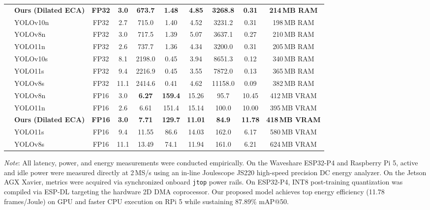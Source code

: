 \begin{table}[t]
{\begin{tabular}{llcccccccc}
\midrule
{}
 & \textbf{Ours (Dilated ECA)} & \textbf{FP32} & \textbf{3.0} & \textbf{673.7} & \textbf{1.48} & \textbf{4.85} & \textbf{3268.8} & \textbf{0.31} & \textbf{214\,MB RAM} \\
 & YOLOv10n & FP32 & 2.7 & 715.0 & 1.40 & 4.52 & 3231.2 & 0.31 & 198\,MB RAM \\
 & YOLOv8n & FP32 & 3.0 & 717.5 & 1.39 & 5.07 & 3637.1 & 0.27 & 210\,MB RAM \\
 & YOLO11n & FP32 & 2.6 & 737.7 & 1.36 & 4.34 & 3200.0 & 0.31 & 205\,MB RAM \\
 & YOLOv10s & FP32 & 8.1 & 2198.0 & 0.45 & 3.94 & 8651.3 & 0.12 & 340\,MB RAM \\
 & YOLO11s & FP32 & 9.4 & 2216.9 & 0.45 & 3.55 & 7872.0 & 0.13 & 365\,MB RAM \\
 & YOLOv8s & FP32 & 11.1 & 2414.6 & 0.41 & 4.62 & 11158.0 & 0.09 & 382\,MB RAM \\
\midrule
{}
 & YOLOv8n & FP16 & 3.0 & \textbf{6.27} & \textbf{159.4} & 15.26 & 95.7 & 10.45 & 412\,MB VRAM \\
 & YOLO11n & FP16 & 2.6 & 6.61 & 151.4 & 15.14 & 100.0 & 10.00 & 395\,MB VRAM \\
 & \textbf{Ours (Dilated ECA)} & \textbf{FP16} & \textbf{3.0} & \textbf{7.71} & \textbf{129.7} & \textbf{11.01} & \textbf{84.9} & \textbf{11.78} & \textbf{418\,MB VRAM} \\
 & YOLO11s & FP16 & 9.4 & 11.55 & 86.6 & 14.03 & 162.0 & 6.17 & 580\,MB VRAM \\
 & YOLOv8s & FP16 & 11.1 & 13.49 & 74.1 & 11.94 & 161.0 & 6.21 & 624\,MB VRAM \\
\bottomrule
\end{tabular}%
}
\vspace{1ex}
{\raggedright \footnotesize \textit{Note}: All latency, power, and energy measurements were conducted empirically. On the Waveshare ESP32-P4 and Raspberry Pi 5, active and idle power were measured directly at 2\,MS/s using an in-line Joulescope JS220 high-speed precision DC energy analyzer. On the Jetson AGX Xavier, metrics were acquired via synchronized onboard \texttt{jtop} power rails. On ESP32-P4, INT8 post-training quantization was compiled via ESP-DL targeting the hardware 2D DMA coprocessor. Our proposed model achieves top energy efficiency (11.78 frames/Joule) on GPU and faster CPU execution on RPi 5 while sustaining 87.89\% mAP@50.\par}
\end{table}
